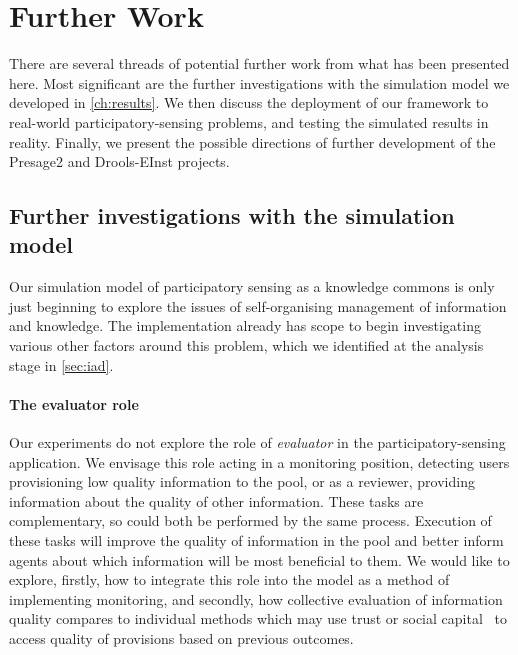 \section{Further Work}

There are several threads of potential further work from what has been
presented here. Most significant are the further investigations with the
simulation model we developed in \autoref{ch:results}. We then discuss the
deployment of our framework to real-world participatory-sensing problems, and
testing the simulated results in reality. Finally, we present the possible
directions of further development of the Presage2 and Drools-EInst projects.


\subsection{Further investigations with the simulation model}

Our simulation model of participatory sensing as a knowledge commons is only
just beginning to explore the issues of self-organising management of
information and knowledge. The implementation already has scope to begin
investigating various other factors around this problem, which we identified at
the analysis stage in \autoref{sec:iad}.


\paragraph{The evaluator role} Our experiments do not explore the role of
\emph{evaluator} in the participatory-sensing application. We envisage this
role acting in a monitoring position, detecting users provisioning low
quality information to the pool, or as a reviewer, providing information about
the quality of other information. These tasks are complementary, so could both
be performed by the same process. Execution of these tasks will improve the
quality of information in the pool and better inform agents about which
information will be most beneficial to them. We would like to explore,
firstly, how to integrate this role into the model as a method of implementing
monitoring, and secondly, how collective evaluation of information quality
compares to individual methods which may use trust or social
capital~\citep{Petruzzi2014} to access quality of provisions based on previous
outcomes.

